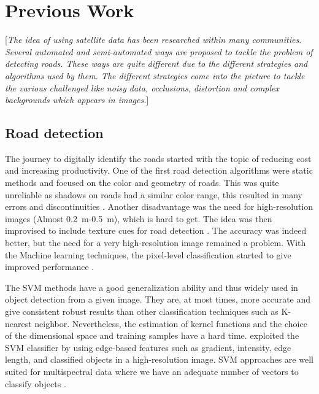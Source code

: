 \chapter{Previous Work}\label{chapt:previous}
[\textit{The idea of using satellite data has been researched within many communities. Several automated and semi-automated ways are proposed to tackle the problem of detecting roads. These ways are quite different due to the different strategies and algorithms used by them. The different strategies come into the picture to tackle the various challenged like noisy data, occlusions, distortion and complex backgrounds which appears in images.}]

\section{Road detection}
The journey to digitally identify the roads started with the topic of reducing cost and increasing productivity. One of the first road detection algorithms were static methods and focused on the color and geometry of roads. This was quite unreliable as shadows on roads had a similar color range, this resulted in many errors and discontinuities \cite{Detecting_interections_using_color,Detecting_roads_using_color}. Another disadvantage was the need for high-resolution images (Almost 0.2~m-0.5~m), which is hard to get. The idea was then improvised to include texture cues for road detection \cite{using_texture_for_road_detection,baumgartner1999automatic}. The accuracy was indeed better, but the need for a very high-resolution image remained a problem. With the Machine learning techniques, the pixel-level classification started to give improved performance \cite{road_detection_using_neural_nets_SVM,road_detection_using_env_learning,road_detection_using_SVM_online_learning}. \par

The SVM methods have a good generalization ability and thus widely used in object detection from a given image. They are, at most times, more accurate and give consistent robust results than other classification techniques such as K-nearest neighbor. Nevertheless, the estimation of kernel functions and the choice of the dimensional space and training samples have a hard time. %
exploited the SVM classifier by using edge-based features such as gradient, intensity, edge length, and classified objects in a high-resolution image. SVM approaches are well suited for multispectral data where we have an adequate number of vectors to classify objects %
. \par

